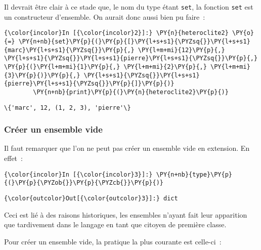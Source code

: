     Il devrait être clair à ce stade que, le nom du type étant \texttt{set},
la fonction \texttt{set} est un constructeur d'ensemble. On aurait donc
aussi bien pu faire~:

    \begin{Verbatim}[commandchars=\\\{\}]
{\color{incolor}In [{\color{incolor}2}]:} \PY{n}{heteroclite2} \PY{o}{=} \PY{n+nb}{set}\PY{p}{(}\PY{p}{[}\PY{l+s+s1}{\PYZsq{}}\PY{l+s+s1}{marc}\PY{l+s+s1}{\PYZsq{}}\PY{p}{,} \PY{l+m+mi}{12}\PY{p}{,} \PY{l+s+s1}{\PYZsq{}}\PY{l+s+s1}{pierre}\PY{l+s+s1}{\PYZsq{}}\PY{p}{,} \PY{p}{(}\PY{l+m+mi}{1}\PY{p}{,} \PY{l+m+mi}{2}\PY{p}{,} \PY{l+m+mi}{3}\PY{p}{)}\PY{p}{,} \PY{l+s+s1}{\PYZsq{}}\PY{l+s+s1}{pierre}\PY{l+s+s1}{\PYZsq{}}\PY{p}{]}\PY{p}{)}
        \PY{n+nb}{print}\PY{p}{(}\PY{n}{heteroclite2}\PY{p}{)}
\end{Verbatim}


    \begin{Verbatim}[commandchars=\\\{\}]
\{'marc', 12, (1, 2, 3), 'pierre'\}

    \end{Verbatim}

    \hypertarget{cruxe9er-un-ensemble-vide}{%
\subsubsection{Créer un ensemble vide}\label{cruxe9er-un-ensemble-vide}}

    Il faut remarquer que l'on ne peut pas créer un ensemble vide en
extension. En effet~:

    \begin{Verbatim}[commandchars=\\\{\}]
{\color{incolor}In [{\color{incolor}3}]:} \PY{n+nb}{type}\PY{p}{(}\PY{p}{\PYZob{}}\PY{p}{\PYZcb{}}\PY{p}{)}
\end{Verbatim}


\begin{Verbatim}[commandchars=\\\{\}]
{\color{outcolor}Out[{\color{outcolor}3}]:} dict
\end{Verbatim}
            
    Ceci est lié à des raisons historiques, les ensembles n'ayant fait leur
apparition que tardivement dans le langage en tant que citoyen de
première classe.

    Pour créer un ensemble vide, la pratique la plus courante est celle-ci~:


